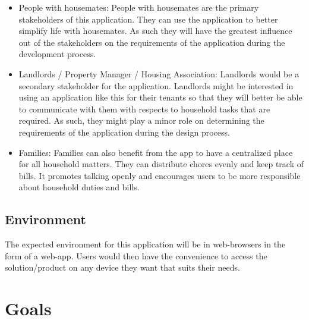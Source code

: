 \documentclass{article}
\begin{document}
\begin{itemize}
  \item People with housemates: People with housemates are the primary stakeholders of this application. They can use the application to better simplify life with housemates. As such they will have the greatest influence out of the stakeholders on the requirements of the application during the development process.
  \item Landlords / Property Manager / Housing Association: Landlords would be a secondary stakeholder for the application. Landlords might be interested in using an application like this for their tenants so that they will better be able to communicate with them with respects to household tasks that are required. As such, they might play a minor role on determining the requirements of the application during the design process.
  \item Families: Families can also benefit from the app to have a centralized place for all household matters. They can distribute chores evenly and keep track of bills. It promotes talking openly and encourages users to be more responsible about household duties and bills.
\end{itemize}

\subsection{Environment}

The expected environment for this application will be in web-browsers in the form of a web-app. Users would then have the convenience to access the solution/product on any device they want that suits their needs. 

\section{Goals}
\end{document}
